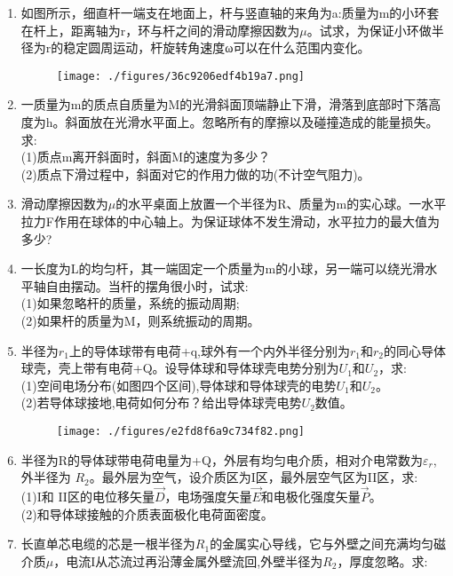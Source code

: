 \begin{enumerate}
\item 如图所示，细直杆一端支在地面上，杆与竖直轴的来角为a:质量为m的小环套在杆上，距离轴为r，环与杆之间的滑动摩擦因数为$\mu$。试求，为保证小环做半径为r的稳定圆周运动，杆旋转角速度ω可以在什么范围内变化。
\begin{figure}[ht]
\centering
\texttt{[image: ./figures/36c9206edf4b19a7.png]}
\caption{} \label{fig_SSD11_1}
\end{figure}
\item 一质量为m的质点自质量为M的光滑斜面顶端静止下滑，滑落到底部时下落高度为h。斜面放在光滑水平面上。忽略所有的摩擦以及碰撞造成的能量损失。求:\\
(1)质点m离开斜面时，斜面M的速度为多少？\\
(2)质点下滑过程中，斜面对它的作用力做的功(不计空气阻力)。
\item 滑动摩擦因数为$\mu$的水平桌面上放置一个半径为R、质量为m的实心球。一水平拉力F作用在球体的中心轴上。为保证球体不发生滑动，水平拉力的最大值为多少?
\item 一长度为L的均匀杆，其一端固定一个质量为m的小球，另一端可以绕光滑水平轴自由摆动。当杆的摆角很小时，试求:\\
(1)如果忽略杆的质量，系统的振动周期;\\
(2)如果杆的质量为M，则系统振动的周期。
\item 半径为$r_1$上的导体球带有电荷+q,球外有一个内外半径分别为$r_1$和$r_2$的同心导体球壳，壳上带有电荷+Q。设导体球和导体球壳电势分别为$U_1$和$U_2$，求:\\
(1)空间电场分布(如图四个区间),导体球和导体球壳的电势$U_1$和$U_2$。\\
(2)若导体球接地,电荷如何分布？给出导体球壳电势$U_2$数值。
\begin{figure}[ht]
\centering
\texttt{[image: ./figures/e2fd8f6a9c734f82.png]}
\caption{} \label{fig_SSD11_2}
\end{figure}
\item 半径为R的导体球带电荷电量为+Q，外层有均匀电介质，相对介电常数为$\varepsilon_r$,外半径为 $R_2$。最外层为空气，设介质区为I区，最外层空气区为II区，求:\\
(1)I和 II区的电位移矢量$\vec D$，电场强度矢量$\vec E$和电极化强度矢量$\vec P$。\\
(2)和导体球接触的介质表面极化电荷面密度。
\item 长直单芯电缆的芯是一根半径为$ R_1$的金属实心导线，它与外壁之间充满均匀磁介质$\mu$，电流I从芯流过再沿薄金属外壁流回,外壁半径为$R_2$，厚度忽略。求:\\

\end{enumerate}
